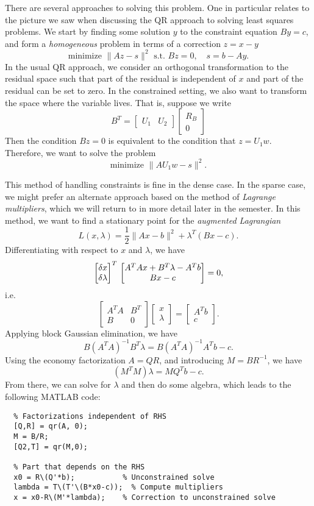 \documentclass[12pt, leqno]{article}
\begin{document}
There are several approaches to solving this problem.  One in
particular relates to the picture we saw when discussing the QR
approach to solving least squares problems.  We start by finding some
solution $y$ to the constraint equation $By = c$, and form a
{\em homogeneous} problem in terms of a correction $z = x-y$
\[
  \mbox{minimize } \|Az-s\|^2 \mbox{ s.t. } Bz = 0, \quad s = b-Ay.
\]
In the usual QR approach, we consider an orthogonal transformation to
the residual space such that part of the residual is independent of
$x$ and part of the residual can be set to zero.  In the constrained
setting, we also want to transform the space where the variable
lives.  That is, suppose we write
\[
  B^T = \begin{bmatrix} U_1 & U_2 \end{bmatrix} \begin{bmatrix} R_B \\ 0 \end{bmatrix}
\]
Then the condition $Bz = 0$ is equivalent to the condition that
$z = U_1 w$.  Therefore, we want to solve the problem
\[
  \mbox{minimize } \|A U_1 w-s\|^2.
\]

This method of handling constraints is fine in the dense case.  In the
sparse case, we might prefer an alternate approach based on the
method of {\em Lagrange multipliers}, which we will return to in
more detail later in the semester.  In this method, we want to find
a stationary point for the {\em augmented Lagrangian}
\[
  L(x,\lambda) = \frac{1}{2} \|Ax-b\|^2 + \lambda^T (Bx-c).
\]
Differentiating with respect to $x$ and $\lambda$, we have
\[
\begin{bmatrix} \delta x \\ \delta \lambda \end{bmatrix}^T \\
\begin{bmatrix}
  A^T A x + B^T \lambda - A^T b \\
  Bx - c
\end{bmatrix} = 0,
\]
i.e.
\[
  \begin{bmatrix} A^T A & B^T \\ B & 0 \end{bmatrix}
  \begin{bmatrix} x \\ \lambda \end{bmatrix} =
  \begin{bmatrix} A^T b \\ c \end{bmatrix}.
\]
Applying block Gaussian elimination, we have
\[
  B (A^T A)^{-1} B^T \lambda = B (A^T A)^{-1} A^T b - c.
\]
Using the economy factorization $A = QR$, and introducing
$M = B R^{-1}$, we have
\[
  (M^T M) \lambda = M Q^T b - c.
\]
From there, we can solve for $\lambda$ and then do some algebra,
which leads to the following MATLAB code:
\begin{lstlisting}
  % Factorizations independent of RHS
  [Q,R] = qr(A, 0);
  M = B/R;
  [Q2,T] = qr(M,0);

  % Part that depends on the RHS
  x0 = R\(Q'*b);           % Unconstrained solve
  lambda = T\(T'\(B*x0-c));  % Compute multipliers
  x = x0-R\(M'*lambda);    % Correction to unconstrained solve
\end{lstlisting}
\end{document}
